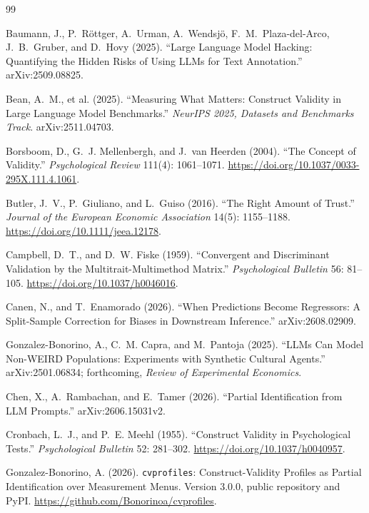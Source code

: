 \documentclass[10pt,letterpaper]{article}
\begin{document}
\clearpage
\begin{thebibliography}{99}\small

 Baumann, J., P.~R\"ottger, A.~Urman, A.~Wendsj\"o, F.~M.~Plaza-del-Arco, J.~B.~Gruber, and D.~Hovy (2025). ``Large Language Model Hacking: Quantifying the Hidden Risks of Using LLMs for Text Annotation.'' arXiv:2509.08825.

 Bean, A.~M., et al. (2025). ``Measuring What Matters: Construct Validity in Large Language Model Benchmarks.'' \textit{NeurIPS 2025, Datasets and Benchmarks Track}. arXiv:2511.04703.

 Borsboom, D., G.~J. Mellenbergh, and J.~van Heerden (2004). ``The Concept of Validity.'' \textit{Psychological Review} 111(4): 1061--1071. \url{https://doi.org/10.1037/0033-295X.111.4.1061}.

 Butler, J.~V., P.~Giuliano, and L.~Guiso (2016). ``The Right Amount of Trust.'' \textit{Journal of the European Economic Association} 14(5): 1155--1188. \url{https://doi.org/10.1111/jeea.12178}.

 Campbell, D.~T., and D.~W. Fiske (1959). ``Convergent and Discriminant Validation by the Multitrait-Multimethod Matrix.'' \textit{Psychological Bulletin} 56: 81--105. \url{https://doi.org/10.1037/h0046016}.

 Canen, N., and T.~Enamorado (2026). ``When Predictions Become Regressors: A Split-Sample Correction for Biases in Downstream Inference.'' arXiv:2608.02909.

 Gonzalez-Bonorino, A., C.~M. Capra, and M.~Pantoja (2025). ``LLMs Can Model Non-WEIRD Populations: Experiments with Synthetic Cultural Agents.'' arXiv:2501.06834; forthcoming, \textit{Review of Experimental Economics}.

 Chen, X., A.~Rambachan, and E.~Tamer (2026). ``Partial Identification from LLM Prompts.'' arXiv:2606.15031v2.

 Cronbach, L.~J., and P.~E. Meehl (1955). ``Construct Validity in Psychological Tests.'' \textit{Psychological Bulletin} 52: 281--302. \url{https://doi.org/10.1037/h0040957}.

 Gonzalez-Bonorino, A. (2026). \texttt{cvprofiles}: Construct-Validity Profiles as Partial Identification over Measurement Menus. Version 3.0.0, public repository and PyPI. \url{https://github.com/Bonorinoa/cvprofiles}.


\end{thebibliography}
\end{document}
